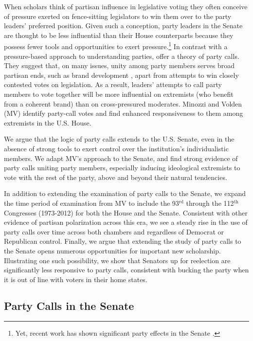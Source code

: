 \documentclass[12pt]{article}
\begin{document}
\noindent When scholars think of partisan influence in legislative voting they often conceive of pressure exerted on fence-sitting legislators to win them over to the party leaders' preferred position.  Given such a conception, party leaders in the Senate are thought to be less influential than their House counterparts because they possess fewer tools and opportunities to exert pressure.\footnote{\doublespacing\normalsize Yet, recent work has shown significant party effects in the Senate \citep[e.g.,][]{Gailmard:2007, Monroe:2008, Patty:2008, Volden:2006}.}  In contrast with a pressure-based approach to understanding parties, \cite{Minozzi:2013} offer a theory of party calls.  They suggest that, on many issues, unity among party members serves broad partisan ends, such as brand development \citep[e.g.,][]{Snyder:2002}, apart from attempts to win closely contested votes on legislation. As a result, leaders' attempts to call party members to vote together will be more influential on extremists (who benefit from a coherent brand) than on cross-pressured moderates. Minozzi and Volden (MV) identify party-call votes and find enhanced responsiveness to them among extremists in the U.S. House.

We argue that the logic of party calls extends to the U.S. Senate, even in the absence of strong tools to exert control over the institution's individualistic members. We adapt MV's approach to the Senate, and find strong evidence of party calls uniting party members, especially inducing ideological extremists to vote with the rest of the party, above and beyond their natural tendencies.

In addition to extending the examination of party calls to the Senate, we expand the time period of examination from MV to include the 93$^{\text{rd}}$ through the 112$^{\text{th}}$ Congresses (1973-2012) for both the House and the Senate. Consistent with other evidence of partisan polarization across this era, we see a steady rise in the use of party calls over time across both chambers and regardless of Democrat or Republican control. Finally, we argue that extending the study of party calls to the Senate opens numerous opportunities for important new scholarship. Illustrating one such possibility, we show that Senators up for reelection are significantly less responsive to party calls, consistent with bucking the party when it is out of line with voters in their home states.

\subsection*{Party Calls in the Senate}
\end{document}
